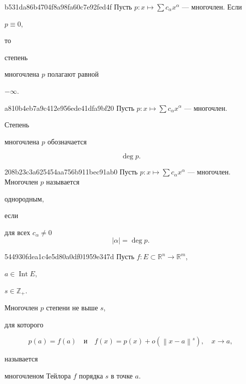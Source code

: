 \begin{note}{b531da86b4704f8a98fa60c7e92fed4f}
    Пусть \({ p : x \mapsto \sum c_{\alpha}x^{\alpha} }\) --- многочлен.
    Если \begin{icloze}{2}\({ p \equiv 0 }\),\end{icloze} то \begin{icloze}{3}степень\end{icloze} многочлена \({ p }\) полагают равной \begin{icloze}{1}\({ -\infty }\).\end{icloze}
\end{note}

\begin{note}{a810b4eb7a9c412e956ede41dfa9bf20}
    Пусть \({ p : x \mapsto \sum c_{\alpha}x^{\alpha} }\) --- многочлен.
    \begin{icloze}{2}Степень\end{icloze} многочлена \({ p }\) обозначается
    \begin{icloze}{1}
        \[
            \deg p.
        \]
    \end{icloze}
\end{note}

\begin{note}{208b23c3a625454aa756b911bec91ab0}
    Пусть \({ p : x \mapsto \sum c_{\alpha}x^{\alpha} }\) --- многочлен.
    Многочлен \({ p }\) называется \begin{icloze}{2}однородным,\end{icloze} если
    \begin{icloze}{1}
        для всех \({ c_{\alpha} \neq 0 }\)
        \[
            \left\lvert \alpha \right\rvert = \deg p.
        \]
    \end{icloze}
\end{note}

\begin{note}{544930fdea1c4e5d80a0df01959e347d}
    Пусть \({ f : E \subset \mathbb R^{n} \to \mathbb R^{m} }\), \begin{icloze}{4}\({ a \in \operatorname{Int} E }\),\end{icloze} \begin{icloze}{5}\({ s \in \mathbb Z_+ }\).\end{icloze}
    \begin{icloze}{2}Многочлен \({ p }\) степени не выше \({ s }\),\end{icloze} для которого
    \begin{icloze}{1}
        \[
            p(a) = f(a) \quad \text{и} \quad f(x) = p(x) + o(\left\lVert x - a \right\rVert^{s}), \quad x \to a,
        \]
    \end{icloze}
    называется \begin{icloze}{3}многочленом Тейлора \({ f }\) порядка \({ s }\) в точке \({ a }\).\end{icloze}
\end{note}

